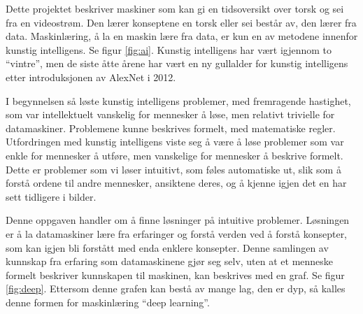 Dette projektet beskriver maskiner som kan gi en tidsoversikt over torsk og sei fra en videostrøm. Den lærer konseptene en torsk eller sei består av, den lærer fra data. Maskinlæring, å la en maskin lære fra data, er kun en av metodene innenfor kunstig intelligens. Se figur \ref{fig:ai}. Kunstig intelligens har vært igjennom to ``vintre'', men de siste åtte årene har vært en ny gullalder for kunstig intelligens etter introduksjonen av AlexNet i 2012. \cite{Canziani m.fl. 2017 s. 1}

I begynnelsen så løste kunstig intelligens problemer, med fremragende hastighet, som var intellektuelt vanskelig for mennesker å løse, men relativt trivielle for datamaskiner. Problemene kunne beskrives formelt, med matematiske regler. Utfordringen med kunstig intelligens viste seg å være å løse problemer som var enkle for mennesker å utføre, men vanskelige for mennesker å beskrive formelt. Dette er problemer som vi løser intuitivt, som føles automatiske ut, slik som å forstå ordene til andre mennesker, ansiktene deres, og å kjenne igjen det en har sett tidligere i bilder. \cite{Goodfellow m.fl. 2016 s. 1}

Denne oppgaven handler om å finne løsninger på intuitive problemer. Løsningen er å la datamaskiner lære fra erfaringer og forstå verden ved å forstå konsepter, som kan igjen bli forstått med enda enklere konsepter. Denne samlingen av kunnskap fra erfaring som datamaskinene gjør seg selv, uten at et menneske formelt beskriver kunnskapen til maskinen, kan beskrives med en graf. Se figur \ref{fig:deep}. Ettersom denne grafen kan bestå av mange lag, den er dyp, så kalles denne formen for maskinlæring ``deep learning''. \cite{Goodfellow m.fl. 2016 s. 1}


